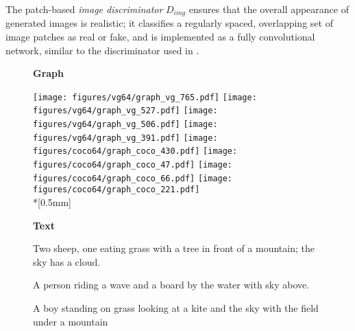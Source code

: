 \documentclass[10pt,twocolumn,letterpaper]{article}
\begin{document}
The patch-based \emph{image discriminator} $D_{img}$ ensures that the overall
appearance of generated images is realistic; it classifies a regularly spaced,
overlapping set of image patches as real or fake, and is implemented as a fully
convolutional network, similar to the discriminator used in \cite{isola2017image}.

\newlength{\qualsize}
\setlength{\qualsize}{0.1192\textwidth}

\newlength{\qualtext}
\setlength{\qualtext}{0.11\textwidth}

\newlength{\qualtextspace}
\setlength{\qualtextspace}{0.005\textwidth}
\begin{figure*}[ht!]
  \centering
  \begin{rotate}{90}
    \textbf{Graph}
  \end{rotate}
  \hspace*{0.5mm}
  \texttt{[image: figures/vg64/graph\_vg\_765.pdf]}
  \texttt{[image: figures/vg64/graph\_vg\_527.pdf]}
  \texttt{[image: figures/vg64/graph\_vg\_506.pdf]}
  \texttt{[image: figures/vg64/graph\_vg\_391.pdf]}
  \texttt{[image: figures/coco64/graph\_coco\_430.pdf]}
  \texttt{[image: figures/coco64/graph\_coco\_47.pdf]}
  \texttt{[image: figures/coco64/graph\_coco\_66.pdf]}
  \texttt{[image: figures/coco64/graph\_coco\_221.pdf]} \\*[0.5mm]
  \begin{rotate}{90}
    \hspace{-2.5mm}\textbf{Text}
  \end{rotate}
  \hspace{\qualtextspace}
  \begin{minipage}{\qualtext}
    \ssmall
    Two sheep, one eating grass with a tree in front of a mountain;
    the sky has a cloud.
  \end{minipage}
  \hspace{\qualtextspace}
  \begin{minipage}{\qualtext}
    \ssmall
    A person riding a wave and a board by the water with sky above.
  \end{minipage}
  \hspace{\qualtextspace}
  \begin{minipage}{\qualtext}
    \ssmall
    A boy standing on grass looking at a kite and the sky with
    the field under a mountain
  \end{minipage}
  \hspace{\qualtextspace}

\end{figure*}
\end{document}
